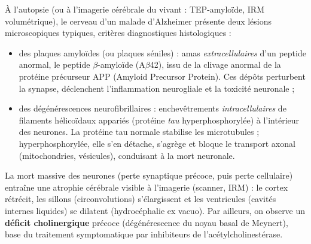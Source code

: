 \documentclass[11pt]{article}
\newcommand{\cle}[1]{{\popxbold\color{popdark}#1}}
\begin{document}
À l'autopsie (ou à l'imagerie cérébrale du vivant : TEP-amyloïde, IRM volumétrique), le cerveau d'un malade d'Alzheimer présente deux lésions microscopiques typiques, critères diagnostiques histologiques :
\begin{itemize}
\item des \cle{plaques amyloïdes} (ou plaques séniles) : amas \emph{extracellulaires} d'un peptide anormal, le peptide $\beta$-amyloïde (A$\beta$42), issu de la clivage anormal de la protéine précurseur APP (Amyloid Precursor Protein). Ces dépôts perturbent la synapse, déclenchent l'inflammation neurogliale et la toxicité neuronale ;
\item des \cle{dégénérescences neurofibrillaires} : enchevêtrements \emph{intracellulaires} de filaments hélicoïdaux appariés (protéine \emph{tau} hyperphosphorylée) à l'intérieur des neurones. La protéine tau normale stabilise les microtubules ; hyperphosphorylée, elle s'en détache, s'agrège et bloque le transport axonal (mitochondries, vésicules), conduisant à la mort neuronale.
\end{itemize}
La mort massive des neurones (perte synaptique précoce, puis perte cellulaire) entraîne une \cle{atrophie cérébrale} visible à l'imagerie (scanner, IRM) : le cortex rétrécit, les sillons (circonvolutions) s'élargissent et les ventricules (cavités internes liquides) se dilatent (hydrocéphalie ex vacuo). Par ailleurs, on observe un \textbf{déficit cholinergique} précoce (dégénérescence du noyau basal de Meynert), base du traitement symptomatique par inhibiteurs de l'acétylcholinestérase.
\end{document}
